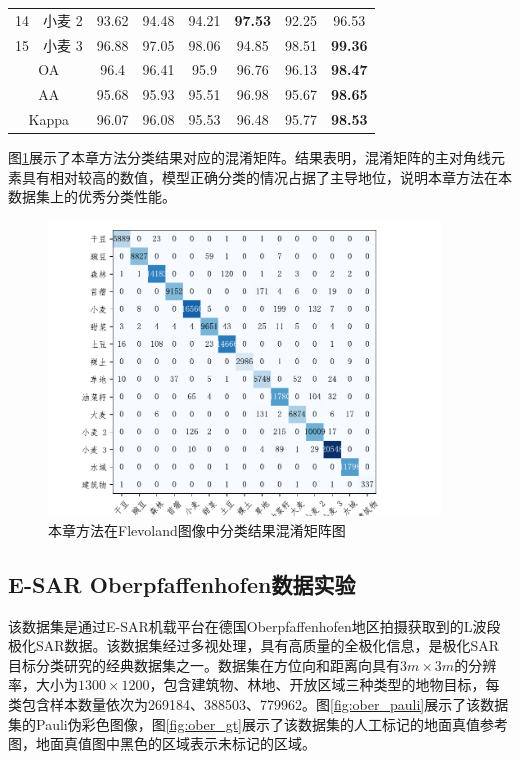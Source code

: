 \begin{table}[ht!]
\begin{tabular}{cccccccc}
        14                        & 小麦 2  & 93.62 & 94.48          & 94.21 & \textbf{97.53} & 92.25          & 96.53          \\
        15                        & 小麦 3  & 96.88 & 97.05          & 98.06 & 94.85          & 98.51          & \textbf{99.36} \\
        \midrule[0.75bp]
        \multicolumn{2}{c}{OA}    & 96.4  & 96.41 & 95.9           & 96.76 & 96.13          & \textbf{98.47}                  \\
        \multicolumn{2}{c}{AA}    & 95.68 & 95.93 & 95.51          & 96.98 & 95.67          & \textbf{98.65}                  \\
        \multicolumn{2}{c}{Kappa} & 96.07 & 96.08 & 95.53          & 96.48 & 95.77          & \textbf{98.53}                  \\
        \bottomrule[1.5bp]
    \end{tabular}
\end{table}

图\ref{fig:fle_conf_matrix}展示了本章方法分类结果对应的混淆矩阵。结果表明，混淆矩阵的主对角线元素具有相对较高的数值，模型正确分类的情况占据了主导地位，说明本章方法在本数据集上的优秀分类性能。

\begin{figure}[h]
    \centering
    \includegraphics[width=10.4cm]{pic/chapter3/fle/conf-matrix.pdf}
    \caption{本章方法在Flevoland图像中分类结果混淆矩阵图}
    \label{fig:fle_conf_matrix}
\end{figure}


\subsection{E-SAR Oberpfaffenhofen数据实验}
该数据集是通过E-SAR机载平台在德国Oberpfaffenhofen地区拍摄获取到的L波段极化SAR数据。该数据集经过多视处理，具有高质量的全极化信息，是极化SAR目标分类研究的经典数据集之一。数据集在方位向和距离向具有$3m \times 3m$的分辨率，大小为$1300 \times 1200$，包含建筑物、林地、开放区域三种类型的地物目标，每类包含样本数量依次为269184、388503、779962。图\ref{fig:ober_pauli}展示了该数据集的Pauli伪彩色图像，图\ref{fig:ober_gt}展示了该数据集的人工标记的地面真值参考图，地面真值图中黑色的区域表示未标记的区域。

